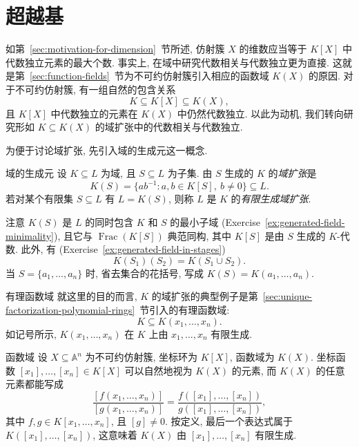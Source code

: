 \section{超越基}\label{sec:transcendence-bases}

如第~\ref{sec:motivation-for-dimension}~节所述, 仿射簇 $X$ 的维数应当等于 $K[X]$ 中代数独立元素的最大个数. 事实上, 在域中研究代数相关与代数独立更为直接. 这就是第~\ref{sec:function-fields}~节为不可约仿射簇引入相应的函数域 $K(X)$ 的原因. 对于不可约仿射簇, 有一组自然的包含关系
\[
  K\subseteq K[X]\subseteq K(X),
\]
且 $K[X]$ 中代数独立的元素在 $K(X)$ 中仍然代数独立. 以此为动机, 我们转向研究形如 $K\subseteq K(X)$ 的域扩张中的代数相关与代数独立.

为便于讨论域扩张, 先引入域的生成元这一概念.

\begin{Definition}{域的生成元}\leavevmode\label{def:field-generators}
设 $K\subseteq L$ 为域, 且 $S\subseteq L$ 为子集. 由 $S$ 生成的 $K$ 的\emph{域扩张}是
\[
  K(S)=\{ab^{-1}:a,b\in K[S],\ b\neq0\}\subseteq L.
\]
若对某个有限集 $S\subseteq L$ 有 $L=K(S)$, 则称 $L$ 是 $K$ 的\emph{有限生成域扩张}.
\end{Definition}

注意 $K(S)$ 是 $L$ 的同时包含 $K$ 和 $S$ 的最小子域 (Exercise~\ref{ex:generated-field-minimality}), 且它与 $\operatorname{Frac}(K[S])$ 典范同构, 其中 $K[S]$ 是由 $S$ 生成的 $K$-代数. 此外, 有 (Exercise~\ref{ex:generated-field-in-stages})
\[
  K(S_{1})(S_{2})=K(S_{1}\cup S_{2}).
\]
当 $S=\{a_{1},\ldots,a_{n}\}$ 时, 省去集合的花括号, 写成 $K(S)=K(a_{1},\ldots,a_{n})$.

\begin{Example}{有理函数域}\leavevmode\label{ex:rational-function-field-generators}
就这里的目的而言, $K$ 的域扩张的典型例子是第~\ref{sec:unique-factorization-polynomial-rings}~节引入的有理函数域:
\[
  K\subseteq K(x_{1},\ldots,x_{n}).
\]
如记号所示, $K(x_{1},\ldots,x_{n})$ 在 $K$ 上由 $x_{1},\ldots,x_{n}$ 有限生成.
\end{Example}

\begin{Example}{函数域}\leavevmode\label{ex:function-field-generated-by-coordinate-functions}
设 $X\subseteq\mathbb{A}^{n}$ 为不可约仿射簇, 坐标环为 $K[X]$, 函数域为 $K(X)$. 坐标函数 $[x_{1}],\ldots,[x_{n}]\in K[X]$ 可以自然地视为 $K(X)$ 的元素, 而 $K(X)$ 的任意元素都能写成
\[
  \frac{[f(x_{1},\ldots,x_{n})]}{[g(x_{1},\ldots,x_{n})]}
  =\frac{f([x_{1}],\ldots,[x_{n}])}{g([x_{1}],\ldots,[x_{n}])},
\]
其中 $f,g\in K[x_{1},\ldots,x_{n}]$, 且 $[g]\neq0$. 按定义, 最后一个表达式属于 $K([x_{1}],\ldots,[x_{n}])$, 这意味着 $K(X)$ 由 $[x_{1}],\ldots,[x_{n}]$ 有限生成.
\end{Example}

